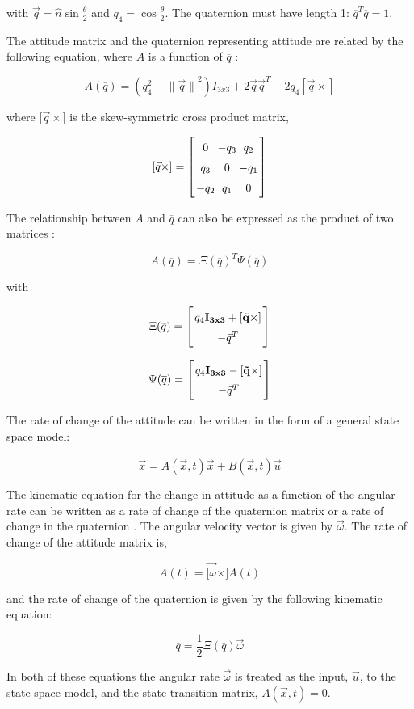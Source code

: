 \documentclass{article}
\newcommand{\mat}[2][ccccccccccccccccccccccccccccccccccccccccccccc]{\left[
        \arraycolsep=1.2pt\def\arraystretch{1.5}
        \begin{array}{#1} #2 \\ 
        \end{array} 
        \right]}
\begin{document}
\begin{flushleft}
with $\vec{q} = \hat{n} \sin{\frac{\theta}{2}}$ and $q_4 = \cos{\frac{\theta}{2}}$. The quaternion must have length 1: $\overline{q}^T \overline{q} = 1$. 

The attitude matrix and the quaternion representing attitude are related by the following equation, where $A$ is a function of $\overline{q}$ \cite{Shuster1982}: 

\[ A(\overline{q}) = (q_4^2 - {\| \vec{q} \|}^2) I_{3x3} + 2 \vec{q}\vec{q}^T - 2 q_4 [\vec{q}\times] \]

where ${[\vec{q}\times}]$ is the skew-symmetric cross product matrix, 

\[ [\vec{q}\times] = \mat{ 0 & -q_3 & q_2 \\ q_3 & 0 & -q_1 \\ -q_2 & q_1 & 0} \]

The relationship between $A$ and $\overline{q}$ can also be expressed as the product of two matrices \cite{Markley2007}: 

\[ A(\overline{q}) = \Xi(\overline{q})^{T} \Psi(\overline{q}) \]

with 

\[ \Xi(\overline{q}) = \mat{q_4 \bf{I}_{3x3} + [\vec{q}\times] \\ -\vec{q}^T } \]

\[ \Psi(\overline{q}) = \mat{q_4 \bf{I}_{3x3} - [\vec{q}\times] \\ -\vec{q}^T } \]

The rate of change of the attitude can be written in the form of a general state space model: 

\[ \dot{\vec{x}} = A(\vec{x}, t) \vec{x} + B(\vec{x}, t) \vec{u} \]

The kinematic equation for the change in attitude as a function of the angular rate can be written as a rate of change of the quaternion matrix or a rate of change in the quaternion \cite{Shuster1982}. The angular velocity vector is given by $\vec{\omega}$. The rate of change of the attitude matrix is, 

\[ \dot{A}(t) = \vec{[\omega}\times] A(t) \]

and the rate of change of the quaternion is given by the following kinematic equation: 

\[ \dot{\overline{q}} = \frac{1}{2} \Xi( \overline{q} )\vec{\omega} \]

In both of these equations the angular rate $\vec{\omega}$ is treated as the input, $\vec{u}$, to the state space model, and the state transition matrix, $A(\vec{x},t) = 0$. 






\end{flushleft}
\end{document}
